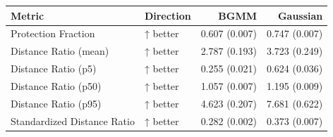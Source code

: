 \begin{tabular}{llrr}
\toprule
                     Metric & Direction &          BGMM &      Gaussian \\
\midrule
        Protection Fraction &  ↑ better & 0.607 (0.007) & 0.747 (0.007) \\
      Distance Ratio (mean) &  ↑ better & 2.787 (0.193) & 3.723 (0.249) \\
        Distance Ratio (p5) &  ↑ better & 0.255 (0.021) & 0.624 (0.036) \\
       Distance Ratio (p50) &  ↑ better & 1.057 (0.007) & 1.195 (0.009) \\
       Distance Ratio (p95) &  ↑ better & 4.623 (0.207) & 7.681 (0.622) \\
Standardized Distance Ratio &  ↑ better & 0.282 (0.002) & 0.373 (0.007) \\
\bottomrule
\end{tabular}
